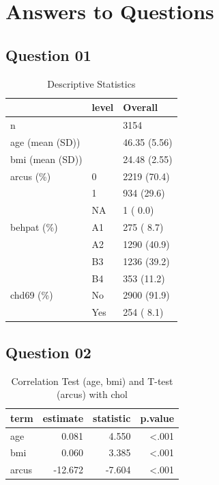 \documentclass[
  12pt,
  oneside]{article}
\begin{document}
\hypertarget{answers-to-questions}{%
\section{Answers to Questions}\label{answers-to-questions}}

\hypertarget{question-01}{%
\subsection{Question 01}\label{question-01}}

\begin{table}[H]

\caption{\label{tab:Table-01}Descriptive Statistics}
\centering
\begin{tabular}[t]{lll}
\toprule
  & level & Overall\\
\midrule
n &  & 3154\\
age (mean (SD)) &  & 46.35 (5.56)\\
bmi (mean (SD)) &  & 24.48 (2.55)\\
arcus (\%) & 0 & 2219 (70.4)\\
 & 1 & 934 (29.6)\\
\addlinespace
 & NA & 1 ( 0.0)\\
behpat (\%) & A1 & 275 ( 8.7)\\
 & A2 & 1290 (40.9)\\
 & B3 & 1236 (39.2)\\
 & B4 & 353 (11.2)\\
\addlinespace
chd69 (\%) & No & 2900 (91.9)\\
 & Yes & 254 ( 8.1)\\
\bottomrule
\end{tabular}
\end{table}

\hypertarget{question-02}{%
\subsection{Question 02}\label{question-02}}

\begin{table}[H]

\caption{\label{tab:Table-02}Correlation Test (age, bmi) and T-test (arcus) with chol}
\centering
\begin{tabular}[t]{lrrr}
\toprule
term & estimate & statistic & p.value\\
\midrule
age & 0.081 & 4.550 & <.001\\
bmi & 0.060 & 3.385 & <.001\\
arcus & -12.672 & -7.604 & <.001\\
\bottomrule
\end{tabular}
\end{table}
\end{document}
